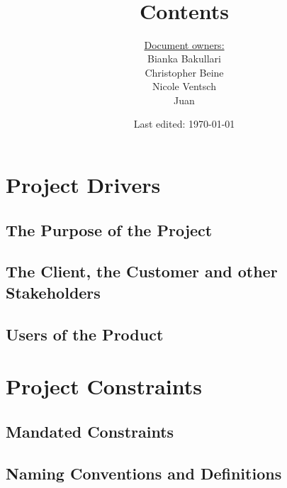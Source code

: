 \documentclass[notitlepage]{article}
\title{%
	\documentName\text{ } \\
  \large \projectName\text{ } \\
  }
\author{
	\large \underline{Document owners:}\\ 
	Bianka Bakullari\\
	\texttt{}
	Christopher Beine\\
	\texttt{}
	Nicole Ventsch\\
	\texttt{}
	Juan\\
	\texttt{}
}
\date{\small{Last edited: \today}}
\begin{document}
\begin{titlepage}
\clearpage\maketitle			%
\thispagestyle{fancy}


\end{titlepage}

\title{ \large \textbf{ Contents}}
\tableofcontents

\newpage

\rfoot{\thepage}				%


\begin{flushleft}				%

\section{Project Drivers}

\subsection{The Purpose of the Project}

\subsection{The Client, the Customer and other Stakeholders}

\subsection{Users of the Product}


\section{Project Constraints}

\subsection{Mandated Constraints}

\subsection{Naming Conventions and Definitions}


\end{flushleft}
\end{document}
